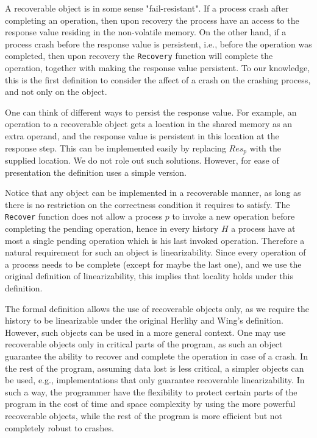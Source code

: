 {A recoverable object is in some sense "fail-resistant". If a process crash after completing an operation, then upon recovery the process have an access to the response value residing in the non-volatile memory. On the other hand, if a process crash before the response value is persistent, i.e., before the operation was completed, then upon recovery the \texttt{Recovery} function will complete the operation, together with making the response value persistent. To our knowledge, this is the first definition to consider the affect of a crash on the crashing process, and not only on the object.

One can think of different ways to persist the response value. For example, an operation to a recoverable object gets a location in the shared memory as an extra operand, and the response value is persistent in this location at the response step. This can be implemented easily by replacing $Res_p$ with the supplied location. We do not role out such solutions. However, for ease of presentation the definition uses a simple version.

Notice that any object can be implemented in a recoverable manner, as long as there is no restriction on the correctness condition it requires to satisfy. The \texttt{Recover} function does not allow a process $p$ to invoke a new operation before completing the pending operation, hence in every history $H$ a process have at most a single pending operation which is his last invoked operation. Therefore a natural requirement for such an object is linearizability. Since every operation of a process needs to be complete (except for maybe the last one), and we use the original definition of linearizability, this implies that locality holds under this definition.



The formal definition allows the use of recoverable objects only, as we require the history to be linearizable under the original Herlihy and Wing's definition. However, such objects can be used in a more general context. One may use recoverable objects only in critical parts of the program, as such an object guarantee the ability to recover and complete the operation in case of a crash. In the rest of the program, assuming data lost is less critical, a simpler objects can be used, e.g., implementations that only guarantee recoverable linearizability.
In such a way, the programmer have the flexibility to protect certain parts of the program in the cost of time and space complexity by using the more powerful recoverable objects, while the rest of the program is more efficient but not completely robust to crashes.


}
